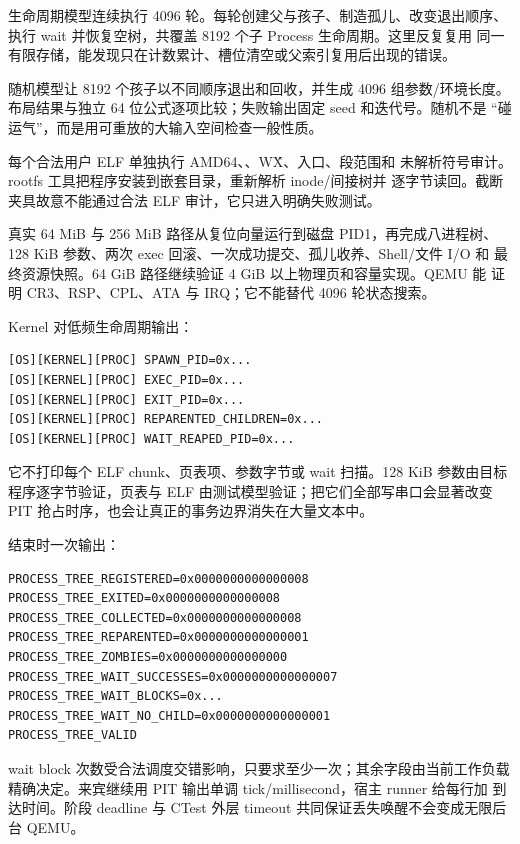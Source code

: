 生命周期模型连续执行 4096 轮。每轮创建父与孩子、制造孤儿、改变退出顺序、
执行 wait 并恢复空树，共覆盖 8192 个子 Process 生命周期。这里反复复用
同一有限存储，能发现只在计数累计、槽位清空或父索引复用后出现的错误。


随机模型让 8192 个孩子以不同顺序退出和回收，并生成 4096 组参数/环境长度。
布局结果与独立 64 位公式逐项比较；失败输出固定 seed 和迭代号。随机不是
“碰运气”，而是用可重放的大输入空间检查一般性质。


每个合法用户 ELF 单独执行 AMD64、、W\^X、入口、段范围和
未解析符号审计。rootfs 工具把程序安装到嵌套目录，重新解析 inode/间接树并
逐字节读回。截断夹具故意不能通过合法 ELF 审计，它只进入明确失败测试。


真实 64 MiB 与 256 MiB 路径从复位向量运行到磁盘 PID1，再完成八进程树、
128 KiB 参数、两次 exec 回滚、一次成功提交、孤儿收养、Shell/文件 I/O 和
最终资源快照。64 GiB 路径继续验证 4 GiB 以上物理页和容量实现。QEMU 能
证明 CR3、RSP、CPL、ATA 与 IRQ；它不能替代 4096 轮状态搜索。

Kernel 对低频生命周期输出：

\begin{lstlisting}[caption={进程生命周期日志}]
[OS][KERNEL][PROC] SPAWN_PID=0x...
[OS][KERNEL][PROC] EXEC_PID=0x...
[OS][KERNEL][PROC] EXIT_PID=0x...
[OS][KERNEL][PROC] REPARENTED_CHILDREN=0x...
[OS][KERNEL][PROC] WAIT_REAPED_PID=0x...
\end{lstlisting}

它不打印每个 ELF chunk、页表项、参数字节或 wait 扫描。128 KiB 参数由目标
程序逐字节验证，页表与 ELF 由测试模型验证；把它们全部写串口会显著改变 PIT
抢占时序，也会让真正的事务边界消失在大量文本中。

结束时一次输出：

\begin{lstlisting}[caption={正常八进程树的精确摘要}]
PROCESS_TREE_REGISTERED=0x0000000000000008
PROCESS_TREE_EXITED=0x0000000000000008
PROCESS_TREE_COLLECTED=0x0000000000000008
PROCESS_TREE_REPARENTED=0x0000000000000001
PROCESS_TREE_ZOMBIES=0x0000000000000000
PROCESS_TREE_WAIT_SUCCESSES=0x0000000000000007
PROCESS_TREE_WAIT_BLOCKS=0x...
PROCESS_TREE_WAIT_NO_CHILD=0x0000000000000001
PROCESS_TREE_VALID
\end{lstlisting}

wait block 次数受合法调度交错影响，只要求至少一次；其余字段由当前工作负载
精确决定。来宾继续用 PIT 输出单调 tick/millisecond，宿主 runner 给每行加
\code{[QEMU][T+...ms]} 到达时间。阶段 deadline 与 CTest 外层 timeout
共同保证丢失唤醒不会变成无限后台 QEMU。

